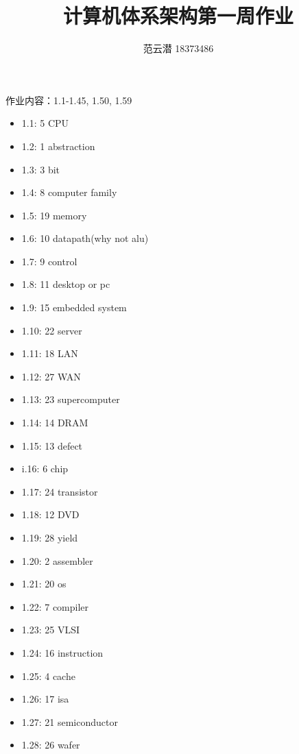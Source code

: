 \documentclass[lang=cn,11pt,a4paper,cite=authoryear]{elegantpaper}
\title{计算机体系架构\quad 第一周作业}
\author{范云潜 18373486}
\institute{微电子学院 184111 班}
\date{\zhtoday}
\begin{document}
\maketitle

作业内容：1.1-1.45, 1.50, 1.59




\begin{itemize}
    \item 1.1: 5 CPU
    \item 1.2: 1 abstraction
    \item 1.3: 3 bit 
    \item 1.4: 8 computer family
    \item 1.5: 19 memory
    \item 1.6: 10 datapath(why not alu)
    \item 1.7: 9 control
    \item 1.8: 11 desktop or pc
    \item 1.9: 15 embedded system
    \item 1.10: 22 server 
    \item 1.11: 18 LAN 
    \item 1.12: 27 WAN 
    \item 1.13: 23 supercomputer
    \item 1.14: 14 DRAM
    \item 1.15: 13 defect
    \item i.16: 6 chip
    \item 1.17: 24 transistor
    \item 1.18: 12 DVD
    \item 1.19: 28 yield
    \item 1.20: 2 assembler
    \item 1.21: 20 os
    \item 1.22: 7 compiler
    \item 1.23: 25 VLSI
    \item 1.24: 16 instruction
    \item 1.25: 4 cache
    \item 1.26: 17 isa 
    \item 1.27: 21 semiconductor
    \item 1.28: 26 wafer 
\end{itemize}

\end{document}

